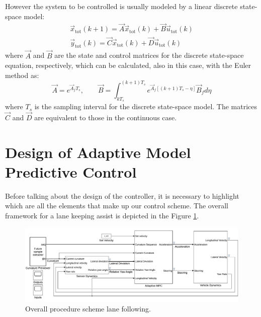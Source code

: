 However the system to be controlled is usually modeled by a linear discrete state-space model:
\begin{equation}
\label{eqn:full_dynamics_model_disc}
\begin{array}{rr}
{\vec{x}}_{\text{tot}}(k+1) =\vec{A} \vec{x}_{\text{tot}}(k)+ \vec{B} \vec{u}_{\text{tot}}(k)\\
\vec{y}_{\text{tot}}(k) = \vec{C}\vec{x}_{\text{tot}}(k) + \vec{D} \vec{u}_{\text{tot}}(k)
\end{array}
\end{equation}
where $\vec{A}$ and $\vec{B}$ are the state and control matrices for the discrete state-space equation, respectively, which can be calculated, also in this case, with the Euler method as:
\begin{equation}
	\vec{A} = e^{\vec{A}_fT_s},\qquad \vec{B} = \int_{kT_s}^{(k+1)T_s} e^{\vec{A}_f[(k+1)T_s-\eta]}\vec{B}_f d\eta
\end{equation}
where $T_s$ is the sampling interval for the discrete state-space model. The matrices $\vec{C}$ and $\vec{D}$ are equivalent to those in the continuous case.

\section{Design of Adaptive Model Predictive Control}
Before talking about the design of the controller, it is necessary to highlight which are all the elements that make up our control scheme. The overall framework for a lane keeping assist is depicted in the Figure \ref{fig:scheme_lane_following}.
\begin{figure}[!h]
	\centering
	\includegraphics[width=\textwidth]{../figure/lane_following_AMPC.pdf}
	\caption{Overall procedure scheme lane following.}
	\label{fig:scheme_lane_following}
\end{figure}

